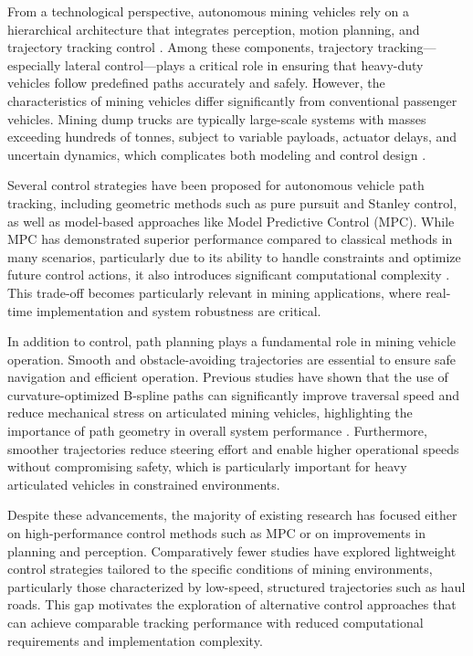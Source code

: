 \documentclass[letterpaper]{ifacconf}
\begin{document}
From a technological perspective, autonomous mining vehicles rely on a hierarchical architecture that integrates perception, motion planning, and trajectory tracking control \cite{refChen2023}. Among these components, trajectory tracking—especially lateral control—plays a critical role in ensuring that heavy-duty vehicles follow predefined paths accurately and safely. However, the characteristics of mining vehicles differ significantly from conventional passenger vehicles. Mining dump trucks are typically large-scale systems with masses exceeding hundreds of tonnes, subject to variable payloads, actuator delays, and uncertain dynamics, which complicates both modeling and control design \cite{refChen2023}.

Several control strategies have been proposed for autonomous vehicle path tracking, including geometric methods such as pure pursuit and Stanley control, as well as model-based approaches like Model Predictive Control (MPC). While MPC has demonstrated superior performance compared to classical methods in many scenarios, particularly due to its ability to handle constraints and optimize future control actions, it also introduces significant computational complexity \cite{refIFACDumpTruck}. This trade-off becomes particularly relevant in mining applications, where real-time implementation and system robustness are critical.

In addition to control, path planning plays a fundamental role in mining vehicle operation. Smooth and obstacle-avoiding trajectories are essential to ensure safe navigation and efficient operation. Previous studies have shown that the use of curvature-optimized B-spline paths can significantly improve traversal speed and reduce mechanical stress on articulated mining vehicles, highlighting the importance of path geometry in overall system performance \cite{refBSpline}. Furthermore, smoother trajectories reduce steering effort and enable higher operational speeds without compromising safety, which is particularly important for heavy articulated vehicles in constrained environments.

Despite these advancements, the majority of existing research has focused either on high-performance control methods such as MPC or on improvements in planning and perception. Comparatively fewer studies have explored lightweight control strategies tailored to the specific conditions of mining environments, particularly those characterized by low-speed, structured trajectories such as haul roads. This gap motivates the exploration of alternative control approaches that can achieve comparable tracking performance with reduced computational requirements and implementation complexity.
\end{document}

